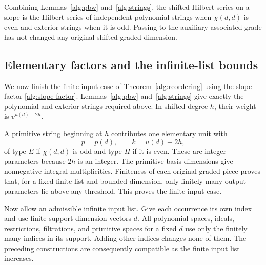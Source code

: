 Combining Lemmas~\ref{alg:pbw} and~\ref{alg:strings}, the shifted
Hilbert series on a slope is the Hilbert series of independent
polynomial strings when $\chi(d,d)$ is even and exterior strings
when it is odd.  Passing to the auxiliary associated grade has not
changed any original shifted graded dimension.

\subsection{Elementary factors and the infinite-list bounds}

We now finish the finite-input case of
Theorem~\ref{alg:reordering} using the slope factor
\eqref{alg:slope-factor}.  Lemmas~\ref{alg:pbw}
and~\ref{alg:strings} give exactly the polynomial and exterior
strings required above.  In shifted degree $h$, their weight is
$v^{u(d)-2h}$.

A primitive
string beginning at $h$ contributes one elementary unit with
\begin{equation}\label{alg:output-parameter}
 p=p(d),\qquad k=u(d)-2h,
\end{equation}
of type $E$ if $\chi(d,d)$ is odd and type $H$ if it is even.
These are integer parameters because $2h$ is an integer.  The
primitive-basis dimensions give nonnegative integral multiplicities.
Finiteness of each original graded piece proves that, for a fixed
finite list and bounded dimension, only finitely many output
parameters lie above any threshold.  This proves the finite-input
case.

Now allow an admissible infinite input list.  Give each occurrence
its own index and use finite-support dimension vectors $d$.  All
polynomial spaces, ideals, restrictions, filtrations, and primitive
spaces for a fixed $d$ use only the finitely many indices in its
support.  Adding other indices changes none of them.  The preceding
constructions are consequently compatible as the finite input list
increases.

